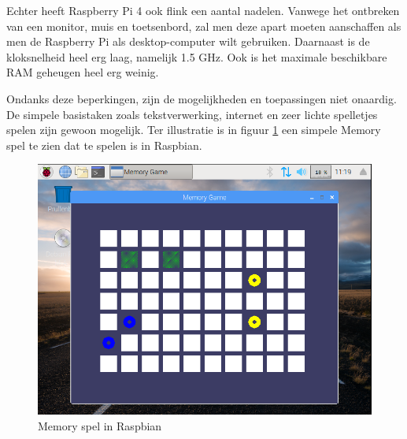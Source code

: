 \documentclass[a4paper, dutch, abstract=true]{scrartcl}
\begin{document}
Echter heeft Raspberry Pi 4 ook flink een aantal nadelen.
Vanwege het ontbreken van een monitor, muis en toetsenbord, zal men deze apart moeten aanschaffen
als men de Raspberry Pi als desktop-computer wilt gebruiken.
Daarnaast is de kloksnelheid heel erg laag, namelijk 1.5 GHz.
Ook is het maximale beschikbare RAM geheugen heel erg weinig.

Ondanks deze beperkingen, zijn de mogelijkheden en toepassingen niet onaardig.
De simpele basistaken zoals tekstverwerking, internet en zeer lichte spelletjes spelen zijn gewoon
mogelijk.
Ter illustratie is in figuur \ref{fig:raspbian-memory} een simpele Memory spel te zien dat te spelen
is in Raspbian.
\begin{figure}[h]
    \centering
    \includegraphics[scale=0.25]{raspbian-memory.png}
    \caption{Memory spel in Raspbian}
    \label{fig:raspbian-memory}
\end{figure}

\end{document}
